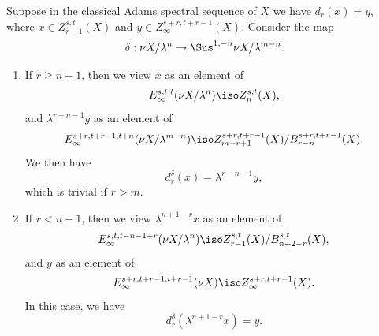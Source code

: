 \documentclass{amsart}
\numberwithin{equation}{section}
\begin{document}
\begin{proposition}\label{prop:6de7d130}
    Suppose in the classical Adams spectral sequence of $X$ we have $d_r(x)=y$, where $x\in Z_{r-1}^{s,t}(X)$ and $y\in Z_\infty^{s+r,t+r-1}(X)$. Consider the map
    $$\delta:\nu X/\lambda^n\to \Sus^{1,-n}\nu X/\lambda^{m-n}.$$
    \begin{enumerate}
        \item If $r\ge n+1$, then we view $x$ as an element of 
        $$E_\infty^{s,t,t}(\nu X/\lambda^n)\iso Z_n^{s,t}(X),$$
        and $\lambda^{r-n-1} y$ as an element of 
        $$E_\infty^{s+r,t+r-1, t+n}(\nu X/\lambda^{m-n})\iso Z_{m-r+1}^{s+r,t+r-1}(X)/B_{r-n}^{s+r,t+r-1}(X).$$
        We then have
        $$d^{\delta}_r(x)=\lambda^{r-n-1}y,$$
        which is trivial if $r>m$.
        \item If $r<n+1$, then we view $\lambda^{n+1-r}x$ as an element of 
        $$E_\infty^{s,t,t-n-1+r}(\nu X/\lambda^n)\iso Z^{s,t}_{r-1}(X)/B^{s,t}_{n+2-r}(X),$$
        and $y$ as an element of 
        $$E_\infty^{s+r,t+r-1, t+r-1}(\nu X)\iso Z_\infty^{s+r,t+r-1}(X).$$
        In this case, we have
        $$d^{\delta}_r(\lambda^{n+1-r}x)=y.$$
    \end{enumerate}
\end{proposition}
\end{document}
